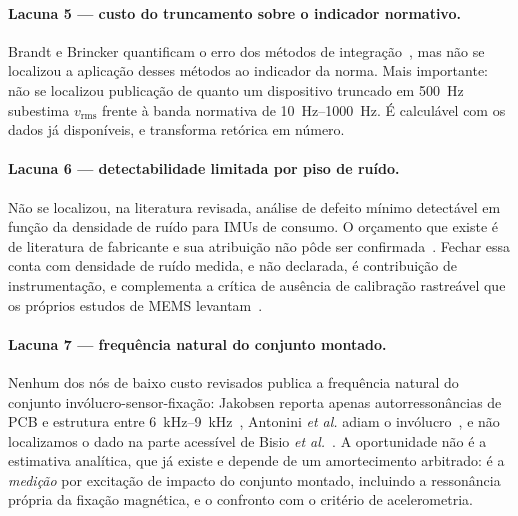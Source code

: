 \documentclass[11pt,a4paper]{article}
\begin{document}
\paragraph{Lacuna 5 --- custo do truncamento sobre o indicador normativo.}
Brandt e Brincker quantificam o erro dos métodos de integração~\cite{brandt2014}, mas
não se localizou a aplicação desses métodos ao indicador da norma. Mais importante: não se
localizou publicação de quanto um dispositivo truncado em \SI{500}{\hertz} subestima
$v_{\mathrm{rms}}$ frente à banda normativa de \SIrange{10}{1000}{\hertz}. É calculável
com os dados já disponíveis, e transforma retórica em número.

\paragraph{Lacuna 6 --- detectabilidade limitada por piso de ruído.} Não se localizou, na
literatura revisada, análise de defeito mínimo detectável em função da densidade de ruído
para IMUs de consumo. O orçamento que existe é de literatura de fabricante e sua atribuição
não pôde ser confirmada~\cite{looney2017}. Fechar essa conta com densidade de ruído medida,
e não declarada, é contribuição de instrumentação, e complementa a crítica de
ausência de calibração rastreável que os próprios estudos de MEMS
levantam~\cite{albarbar2008,rodrigues2021}.

\paragraph{Lacuna 7 --- frequência natural do conjunto montado.} Nenhum dos nós de baixo
custo revisados publica a frequência natural do conjunto invólucro-sensor-fixação:
Jakobsen reporta apenas autorressonâncias de PCB e estrutura entre
\SIrange{6}{9}{\kilo\hertz}~\cite{jakobsen2024}, Antonini \emph{et al.} adiam o
invólucro~\cite{antonini2023}, e não localizamos o dado na parte acessível de
Bisio \emph{et al.}~\cite{bisio2025}. A oportunidade não é a estimativa analítica, que
já existe e depende de um amortecimento arbitrado: é a \emph{medição} por excitação de
impacto do conjunto montado, incluindo a ressonância própria da fixação magnética, e o
confronto com o critério de acelerometria.
\end{document}
